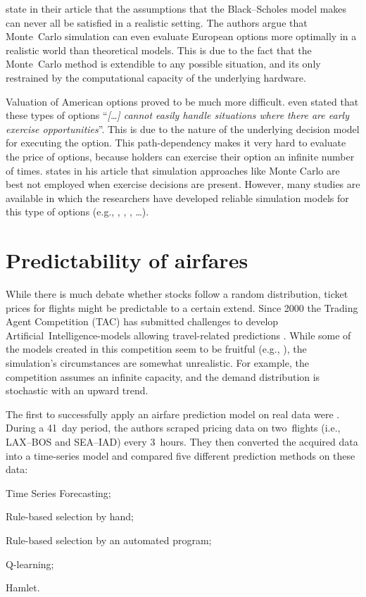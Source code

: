  state in their article that the assumptions that the Black--Scholes model makes can never all be satisfied in a realistic setting. The authors argue that Monte~Carlo simulation can even evaluate European options more optimally in a realistic world than theoretical models. This is due to the fact that the Monte~Carlo method is extendible to any possible situation, and its only restrained by the computational capacity of the underlying hardware.

Valuation of American options proved to be much more difficult.  even stated that these types of options ``\textit{[\ldots] cannot easily handle situations where there are early exercise opportunities}''. This is due to the nature of the underlying decision model for executing the option. This path-dependency makes it very hard to evaluate the price of options, because holders can exercise their option an infinite number of times.  states in his article that simulation approaches like Monte Carlo are best not employed when exercise decisions are present. However, many studies are available in which the researchers have developed reliable simulation models for this type of options (e.g., , , , \ldots).


\section{Predictability of airfares}
\label{sec:PredictabilityOfAirfares}
While there is much debate whether stocks follow a random distribution, ticket prices for flights might be predictable to a certain extend. Since 2000 the Trading Agent Competition (TAC) has submitted challenges to develop Artificial~Intelligence-models allowing travel-related predictions . While some of the models created in this competition seem to be fruitful (e.g., ), the simulation's circumstances are somewhat unrealistic. For example, the competition assumes an infinite capacity, and the demand distribution is stochastic with an upward trend.

The first to successfully apply an airfare prediction model on real data were . During a 41~day period, the authors scraped pricing data on two~flights (i.e., LAX--BOS and SEA--IAD) every 3~hours. They then converted the acquired data into a time-series model and compared five different prediction methods on these data:
\begin{inparaenum}
\item Time Series Forecasting;
\item Rule-based selection by hand;
\item Rule-based selection by an automated program;
\item Q-learning;
\item Hamlet.
\end{inparaenum}

